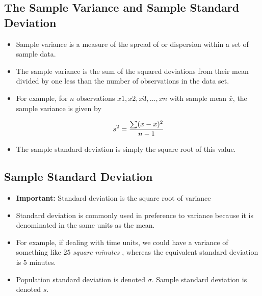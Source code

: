 \documentclass[a4paper,12pt]{article}
\begin{document}

\subsection*{The Sample Variance and Sample Standard Deviation}	


\begin{itemize}
	
	\item Sample variance is a measure of the spread of or dispersion within a set of sample data.
	
	\item The sample variance is the sum of the squared deviations from their mean divided by one less than the number of observations in the data set. 
	
	\item For example, for $n$ observations $x1, x2, x3, \ldots , xn$  with sample mean $\bar{x}$, the sample variance is given by 
	
	
	\[ s^2 = { \sum (x-\bar{x})^2  \over n-1}\]
	
	
	\item The sample standard deviation is simply the square root of this value.
	
\end{itemize}




\subsection*{Sample Standard Deviation}
	\begin{itemize}
		\item \textbf{Important:} Standard deviation is the square root of variance
		\item Standard deviation is commonly used in preference to variance because it is denominated in the same units as the mean.
		\item For example, if dealing with time units, we could have a variance of something like $25$ \emph{ square minutes }, whereas the equivalent standard deviation is 5 minutes.
		\item Population standard deviation is denoted  $\sigma$.
 Sample standard deviation is denoted $s$.
	\end{itemize}



\end{document}
